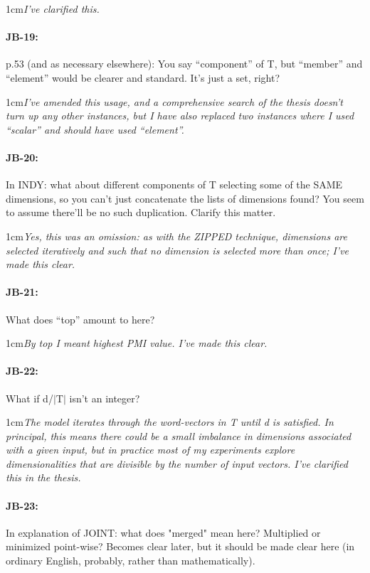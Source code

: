 \documentclass[11pt,a4paper]{article}
\newcommand{\res}[1]{\vspace{0.25cm} \begin{adjustwidth}{1cm}{}\emph{#1}\end{adjustwidth}}
\begin{document}
\res{I've clarified this.}

\paragraph{JB-19:} p.53 (and as necessary elsewhere): You say ``component'' of T, but ``member'' and ``element'' would be clearer and standard. It's just a set, right?

\res{I've amended this usage, and a comprehensive search of the thesis doesn't turn up any other instances, but I have also replaced two instances where I used ``scalar'' and should have used ``element''.}

\paragraph{JB-20:} In INDY: what about different components of T selecting some of the SAME dimensions, so you can't just concatenate the lists of dimensions found? You seem to assume there'll be no such duplication. Clarify this matter.

\res{Yes, this was an omission: as with the ZIPPED technique, dimensions are selected iteratively and such that no dimension is selected more than once; I've made this clear.}

\paragraph{JB-21:} What does ``top'' amount to here?

\res{By top I meant highest PMI value.  I've made this clear.}

\paragraph{JB-22:} What if d/$|$T$|$ isn't an integer?

\res{The model iterates through the word-vectors in T until d is satisfied.  In principal, this means there could be a small imbalance in dimensions associated with a given input, but in practice most of my experiments explore dimensionalities that are divisible by the number of input vectors.  I've clarified this in the thesis.}

\paragraph{JB-23:} In explanation of JOINT: what does "merged" mean here? Multiplied or minimized point-wise? Becomes clear later, but it should be made clear here (in ordinary English, probably, rather than mathematically).
\end{document}
